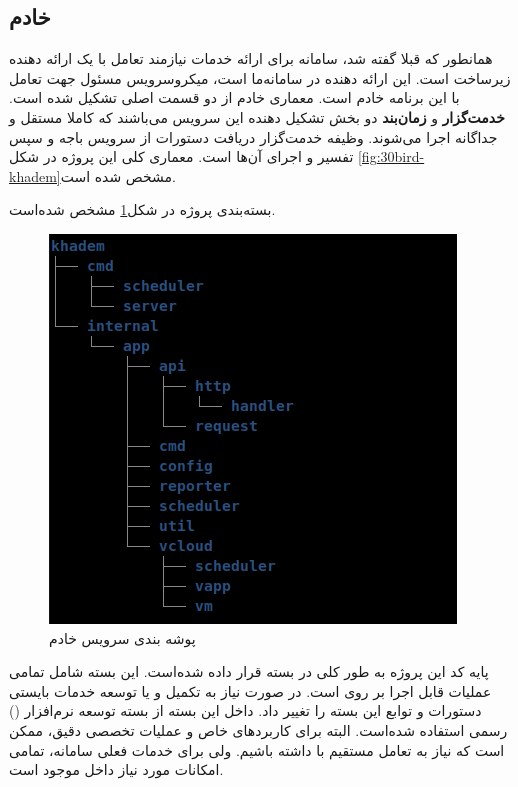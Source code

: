 \clearpage
\subsection{خادم}
همانطور که قبلا گفته شد، سامانه برای ارائه خدمات  نیازمند تعامل با یک ارائه دهنده زیرساخت است. این ارائه دهنده در سامانه‌ما  است، میکروسرویس مسئول جهت تعامل با این برنامه خادم است. معماری خادم از دو قسمت اصلی تشکیل شده است. \textbf{خدمت‌گزار} و \textbf{زمان‌بند} دو بخش تشکیل دهنده این سرویس می‌باشند که کاملا مستقل و جداگانه اجرا می‌شوند. وظیفه خدمت‌گزار دریافت دستورات از سرویس باجه و سپس تفسیر و اجرای آن‌‌ها است. معماری کلی این پروژه در شکل \ref{fig:30bird-khadem}مشخص شده است.

بسته‌بندی پروژه در شکل\ref{fig:30bird-khadem-dir} مشخص شده‌است.

\begin{figure}
	\vspace{1cm}
	\centering
	\includegraphics[scale=0.7]{figures/khadem-dir.png}
	\caption{پوشه بندی سرویس خادم}
	\label{fig:30bird-khadem-dir}
\end{figure}

پایه کد این پروژه به طور کلی در بسته  قرار داده شده‌است. این بسته شامل تمامی عملیات قابل اجرا بر روی  است. در صورت نیاز به تکمیل و یا توسعه خدمات بایستی دستورات و توابع این بسته را تغییر داد. داخل این بسته از بسته توسعه نرم‌افزار () رسمی  استفاده شده‌است. البته برای کاربرد‌های خاص و عملیات تخصصی دقیق، ممکن است که نیاز به تعامل مستقیم با  داشته باشیم. ولی برای خدمات فعلی سامانه، تمامی امکانات مورد نیاز داخل  موجود است.

